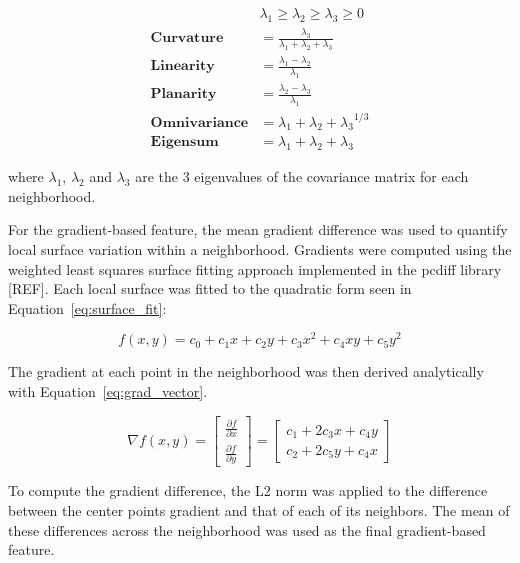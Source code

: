 \begin{equation}
\begin{aligned}
    &\lambda_1 \geq \lambda_2 \geq \lambda_3 \geq 0 \\
    \textbf{Curvature} &= \frac{\lambda_3}{\lambda_1 + \lambda_2 + \lambda_3} \\
    \textbf{Linearity} &= \frac{\lambda_1 - \lambda_2}{\lambda_1} \\
    \textbf{Planarity} &= \frac{\lambda_2 - \lambda_3}{\lambda_1} \\
    \textbf{Omnivariance} &= {\lambda_1 + \lambda_2 + \lambda_3}^{1/3} \\
    \textbf{Eigensum} &= \lambda_1 + \lambda_2 + \lambda_3
\end{aligned}
\label{eq:eigenvalue_features}
\end{equation}

where $\lambda_1$, $\lambda_2$ and $\lambda_3$ are the 3 eigenvalues of the covariance matrix for each neighborhood.

For the gradient-based feature, the mean gradient difference was used to quantify local surface variation within a neighborhood. Gradients were computed using the weighted least squares surface fitting approach implemented in the pcdiff library [REF]. Each local surface was fitted to the quadratic form seen in Equation~\ref{eq:surface_fit}:

\begin{equation}
f(x, y) = c_0 + c_1 x + c_2 y + c_3 x^2 + c_4 x y + c_5 y^2
\label{eq:surface_fit}
\end{equation}

The gradient at each point in the neighborhood was then derived analytically with Equation~\ref{eq:grad_vector}.

\begin{equation}
\nabla f(x, y) =
\begin{bmatrix}
\frac{\partial f}{\partial x} \\
\frac{\partial f}{\partial y}
\end{bmatrix}
=
\begin{bmatrix}
c_1 + 2c_3 x + c_4 y \\
c_2 + 2c_5 y + c_4 x
\end{bmatrix}
\label{eq:grad_vector}
\end{equation}

To compute the gradient difference, the L2 norm was applied to the difference between the center points gradient and that of each of its neighbors. The mean of these differences across the neighborhood was used as the final gradient-based feature.

